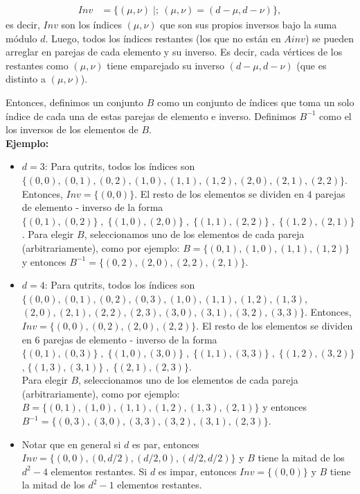 \begin{align*}
Inv &= \{(\mu,\nu)\; | ;\ (\mu , \nu) = (d-\mu, d-\nu)\},
\end{align*}
es decir, $Inv$ son los índices $(\mu,\nu)$ que son sus propios inversos bajo la suma módulo $d$. 
Luego, todos los índices restantes (los que no están en $Ainv$) se pueden arreglar en parejas de cada elemento y su inverso. Es decir, cada vértices  de los restantes como $(\mu,\nu)$ tiene emparejado su inverso $(d-\mu,d-\nu)$ (que es distinto a $(\mu,\nu)$). 

Entonces, definimos un conjunto $B$ como un conjunto de  índices que toma un solo índice de cada una de estas parejas de elemento e inverso. Definimos $B^{-1}$ como el los inversos de los elementos de $B$. \\

\textbf{Ejemplo:}
\begin{itemize}
\item $d=3$: Para qutrits, todos los índices son $\{(0,0), (0,1), (0,2), (1,0) ,(1,1), (1,2), (2,0), (2,1), (2,2) \}$. Entonces, $Inv = \{(0,0)\}$. El resto de los elementos se dividen en $4$ parejas de elemento - inverso de la forma $\{(0,1), (0,2)\} \; ,\; \{(1,0), (2,0)\} \; ,\; \{(1,1), (2,2)\} \; ,\; \{(1,2) , (2,1)\}$. Para elegir $B$, seleccionamos uno de los elementos de cada pareja (arbitrariamente), como por ejemplo: $B = \{(0,1), (1,0), (1,1) ,(1,2)\}$ y entonces $B^{-1} = \{(0,2), (2,0), (2,2), (2,1)\}$.\\

\item $d=4$: Para qutrits, todos los índices son $\{(0,0), (0,1), (0,2),(0,3), (1,0) ,(1,1), (1,2),(1,3)$, $(2,0), (2,1), (2,2),(2,3) , (3,0), (3,1),(3,2), (3,3) \}$. Entonces, $Inv = \{(0,0), (0,2), (2,0), (2,2)\}$. El resto de los elementos se dividen en $6$ parejas de elemento - inverso de la forma \\
$\{(0,1), (0,3)\} \; ,\; \{(1,0), (3,0)\} \; ,\; \{(1,1), (3,3)\} \; ,\; \{(1,2) , (3,2)\} \;$ ,$\; \{(1,3) , (3,1)\} \; ,\; \{(2,1), (2,3)\}$. \\
Para elegir $B$, seleccionamos uno de los elementos de cada pareja (arbitrariamente), como por ejemplo: $B = \{(0,1), (1,0), (1,1) ,(1,2), (1,3), (2,1)\}$ y entonces \\
$B^{-1} = \{(0,3) ,(3,0),(3,3),(3,2),(3,1),(2,3)\}$. \\
\item Notar que en general si $d$ es par, entonces $Inv = \{ (0,0) , (0,d/2), (d/2,0), (d/2,d/2)\}$ y $B$ tiene la mitad de los $d^2-4$ elementos restantes. Si $d$ es impar, entonces $Inv = \{(0,0)\}$ y $B$ tiene la mitad de los $d^2 - 1$ elementos restantes. 
\end{itemize}

